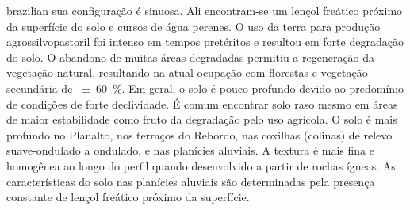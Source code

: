 \begin{chapterabstract}{brazilian}{\ptkeys}
sua configuração é sinuosa. Ali encontram-se um lençol freático próximo da superfície do solo e cursos de água 
perenes. O uso da terra para produção agrossilvopastoril foi intenso em tempos pretéritos e resultou em forte 
degradação do solo. O abandono de muitas áreas degradadas permitiu a regeneração da vegetação natural, 
resultando na atual ocupação com florestas e vegetação secundária de \SI{\pm60}{\percent}. Em geral, o solo é 
pouco profundo devido ao predomínio de condições de forte declividade. É comum encontrar solo raso mesmo em 
áreas de maior estabilidade como fruto da degradação pelo uso agrícola. O solo é mais profundo no Planalto, nos 
terraços do Rebordo, nas coxilhas (colinas) de relevo suave-ondulado a ondulado, e nas planícies aluviais. A 
textura é mais fina e homogênea ao longo do perfil quando desenvolvido a partir de rochas ígneas. As 
características do solo nas planícies aluviais são determinadas pela presença constante de lençol freático 
próximo da superfície.
\end{chapterabstract}

\def\enkeys{Paraná Geological Province. DNOS Catchment. Plateau Border. Soil-forming factors. Pedogenesis}
  
